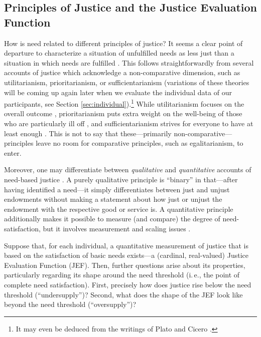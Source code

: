 \documentclass[12pt]{scrartcl}
\begin{document}
\subsection{Principles of Justice and the Justice Evaluation Function}\label{sec:principles}
How is need related to different principles of justice?
It seems a clear point of departure to characterize a situation of unfulfilled needs as less just than a situation in which needs are fulfilled \citep{kipnis_economic_1985}.
This follows straightforwardly from several accounts of justice which acknowledge a non-comparative dimension, such as utilitarianism, prioritarianism, or sufficientarianism (variations of these theories will be coming up again later when we evaluate the individual data of our participants, see Section \ref{sec:individual}).\footnote{It may even be deduced from the writings of Plato and Cicero \citep[see][]{siebel_each_2017}.}
While utilitarianism focuses on the overall outcome \citep[e.\,g.,][]{bentham_introduction_2009,mill_utilitarianism_1998}, prioritarianism puts extra weight on the well-being of those who are particularly ill off \citep[e.\,g.,][]{parfit_equality_1997}, and sufficientarianism strives for everyone to have at least enough \citep[e.\,g.,][]{frankfurt_equality_1987,crisp_egalitarianism_2003,schramme_is_2006}.
This is not to say that these---primarily non-comparative---principles leave no room for comparative principles, such as egalitarianism, to enter.

Moreover, one may differentiate between \textit{qualitative} and \textit{quantitative} accounts of need-based justice \citep[see][]{siebel_need_2020}.
A purely qualitative principle is ``binary'' in that---after having identified a need---it simply differentiates between just and unjust endowments without making a statement about how just or unjust the endowment with the respective good or service is.
A quantitative principle additionally makes it possible to measure (and compare) the degree of need-satisfaction, but it involves measurement and scaling issues \citep[see][]{diederich_identifying_2020}.

Suppose that, for each individual, a quantitative measurement of justice that is based on the satisfaction of basic needs exists---a (cardinal, real-valued) Justice Evaluation Function (JEF).
Then, further questions arise about its properties, particularly regarding its shape around the need threshold (i.\,e., the point of complete need satisfaction).
First, precisely how does justice rise below the need threshold (``undersupply'')? Second, what does the shape of the JEF look like beyond the need threshold (``oversupply'')?
\end{document}
